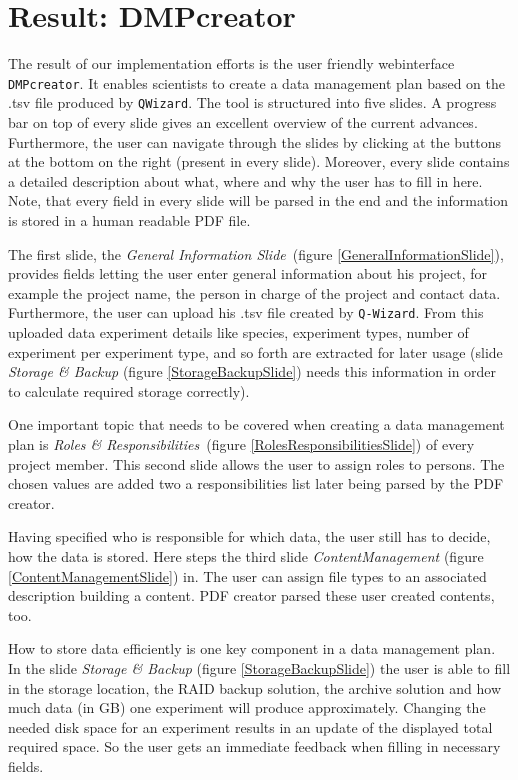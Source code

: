 
\section{Result: DMPcreator}
The result of our implementation efforts is the user friendly webinterface \texttt{DMPcreator}. It enables scientists to create a data management plan based on the .tsv file produced by \texttt{QWizard}. The tool is structured into five slides. A progress bar on top of every slide gives an excellent overview of the current advances. Furthermore, the user can navigate through the slides by clicking at the buttons at the bottom on the right (present in every slide). Moreover, every slide contains a detailed description about what, where and why the user has to fill in here. Note, that every field in every slide will be parsed in the end and the information is stored in a human readable PDF file.\par
The first slide, the \textit{General Information Slide}~(figure \ref{GeneralInformationSlide}), provides fields letting the user enter general information about his project, for example the project name, the person in charge of the project and contact data. Furthermore, the user can upload his .tsv file created by \texttt{Q-Wizard}. From this uploaded data experiment details like species, experiment types, number of experiment per experiment type, and so forth are extracted for later usage (slide \textit{Storage \& Backup} (figure \ref{StorageBackupSlide}) needs this information in order to calculate required storage correctly). \par
One important topic that needs to be covered when creating a data management plan is \textit{Roles \& Responsibilities}~(figure \ref{RolesResponsibilitiesSlide}) of every project member. This second slide allows the user to assign roles to persons. The chosen values are added two a responsibilities list later being parsed by the PDF creator. \par Having specified who is responsible for which data, the user still has to decide, how the data is stored. Here steps the third slide \textit{ContentManagement} (figure \ref{ContentManagementSlide}) in. The user can assign file types to an associated description building a content. PDF creator parsed these user created contents, too. \par
How to store data efficiently is one key component in a data management plan. In the slide \textit{Storage \& Backup} (figure \ref{StorageBackupSlide}) the user is able to fill in the storage location, the RAID backup solution, the archive solution and how much data (in GB) one experiment will produce approximately. Changing the needed disk space for an experiment results in an update of the displayed total required space. So the user gets an immediate feedback when filling in necessary fields. \par

